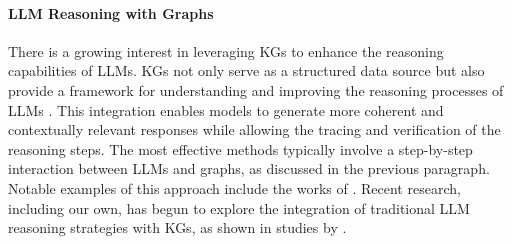 
\vspace{-2pt} 
\paragraph{LLM Reasoning with Graphs} There is a growing interest in leveraging KGs to enhance the reasoning capabilities of LLMs. KGs not only serve as a structured data source but also provide a framework for understanding and improving the reasoning processes of LLMs \cite{wang2024understanding}. This integration enables models to generate more coherent and contextually relevant responses while allowing the tracing and verification of the reasoning steps. The most effective methods typically involve a step-by-step interaction between LLMs and graphs, as discussed in the previous paragraph. Notable examples of this approach include the works of \citet{think-on-graph, mindmap, rog, kg-gpt}. Recent research, including our own, has begun to explore the integration of traditional LLM reasoning strategies with KGs, as shown in studies by \citet{graphCoT, tree-of-traversals}.

\vspace{-2pt}